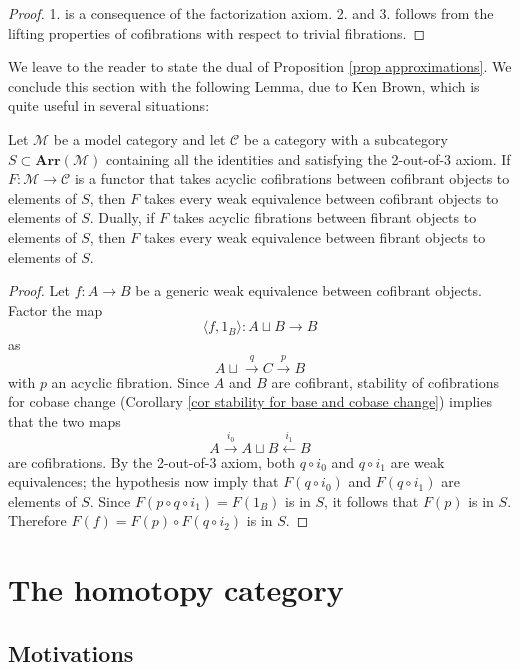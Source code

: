 \begin{refsection}
\begin{proof}
1. is a consequence of the factorization axiom. 2. and 3. follows from the lifting properties of cofibrations with respect to trivial fibrations. 
\end{proof}

We leave to the reader to state the dual of Proposition \ref{prop approximations}. We conclude this section with the following Lemma, due to Ken Brown, which is quite useful in several situations:

\begin{lemma} \label{lemma Ken Brown}
Let $\mathcal M$ be a model category and let $\mathcal C$ be a category with a subcategory $S \subset \mathbf{Arr}(\mathcal M)$ containing all the identities and satisfying the 2-out-of-3 axiom. If $F \colon \mathcal M \to \mathcal C$ is a functor that takes acyclic cofibrations between cofibrant objects to elements of $S$, then $F$ takes every weak equivalence between cofibrant objects to elements of $S$. Dually, if $F$ takes acyclic fibrations between fibrant objects to elements of $S$, then $F$ takes every weak equivalence between fibrant objects to elements of $S$.
\end{lemma}

\begin{proof}
Let $f \colon A \to B$ be a generic weak equivalence between cofibrant objects. Factor the map
\[
\langle f, 1_B \rangle \colon A \sqcup B \to B
\]
as
\[
A \sqcup \xrightarrow{q} C \xrightarrow{p} B
\]
with $p$ an acyclic fibration. Since $A$ and $B$ are cofibrant, stability of cofibrations for cobase change (Corollary \ref{cor stability for base and cobase change}) implies that the two maps
\[
A \xrightarrow{i_0} A \sqcup B \xleftarrow{i_1} B
\]
are cofibrations. By the 2-out-of-3 axiom, both $q \circ i_0$ and $q \circ i_1$ are weak equivalences; the hypothesis now imply that $F(q \circ i_0)$ and $F(q \circ i_1)$ are elements of $S$. Since $F(p \circ q \circ i_1) = F(1_B)$ is in $S$, it follows that $F(p)$ is in $S$. Therefore $F(f) = F(p) \circ F(q \circ i_2)$ is in $S$.
\end{proof}

\section{The homotopy category} \label{homotopy category}

\subsection{Motivations}


\end{refsection}
